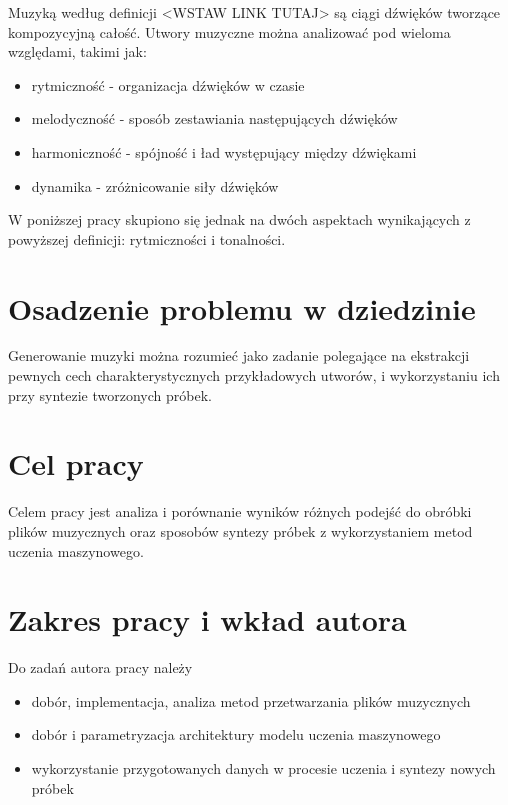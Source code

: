 {{    %
    Muzyką według definicji <WSTAW LINK TUTAJ> są ciągi dźwięków tworzące kompozycyjną całość. 
    Utwory muzyczne można analizować pod wieloma względami, takimi jak:
    \begin{itemize}
        \item rytmiczność - organizacja dźwięków w czasie
        \item melodyczność - sposób zestawiania następujących dźwięków 
        \item harmoniczność - spójność i ład występujący między dźwiękami
        \item dynamika - zróżnicowanie siły dźwięków
    \end{itemize}
    W poniższej pracy skupiono się jednak na dwóch aspektach wynikających 
    z powyższej definicji: rytmiczności i tonalności.
 }

 \section{Osadzenie problemu w dziedzinie}
 {
    Generowanie muzyki można rozumieć jako zadanie polegające 
    na ekstrakcji pewnych cech charakterystycznych
    przykładowych utworów, i wykorzystaniu ich przy syntezie tworzonych próbek. 
 }

 \section{Cel pracy}
 {
    Celem pracy jest analiza i porównanie wyników różnych podejść 
    do obróbki plików muzycznych oraz sposobów syntezy próbek 
    z wykorzystaniem metod uczenia maszynowego. 
 }

 \section{Zakres pracy i wkład autora}
 {
    Do zadań autora pracy należy
    \begin{itemize}
        \item dobór, implementacja, analiza metod przetwarzania plików muzycznych
        \item dobór i parametryzacja architektury modelu uczenia maszynowego
        \item wykorzystanie przygotowanych danych 
        w procesie uczenia i syntezy nowych próbek
    \end{itemize}

    
 }
}


